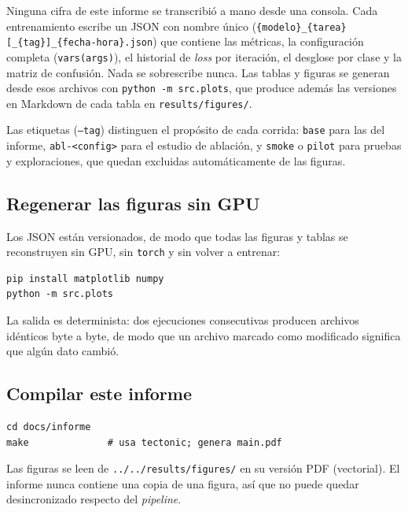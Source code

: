 Ninguna cifra de este informe se transcribió a mano desde una consola. Cada
entrenamiento escribe un JSON con nombre único
(\texttt{\{modelo\}\_\{tarea\}[\_\{tag\}]\_\{fecha-hora\}.json}) que contiene
las métricas, la configuración completa (\texttt{vars(args)}), el historial de
\textit{loss} por iteración, el desglose por clase y la matriz de confusión.
Nada se sobrescribe nunca. Las tablas y figuras se generan desde esos archivos
con \texttt{python -m src.plots}, que produce además las versiones en Markdown
de cada tabla en \texttt{results/figures/}.

Las etiquetas (\texttt{--tag}) distinguen el propósito de cada corrida:
\texttt{base} para las del informe, \texttt{abl-<config>} para el estudio de
ablación, y \texttt{smoke} o \texttt{pilot} para pruebas y exploraciones, que
quedan excluidas automáticamente de las figuras.

\subsection{Regenerar las figuras sin GPU}

Los JSON están versionados, de modo que todas las figuras y tablas se
reconstruyen sin GPU, sin \texttt{torch} y sin volver a entrenar:

\begin{lstlisting}
pip install matplotlib numpy
python -m src.plots
\end{lstlisting}

La salida es determinista: dos ejecuciones consecutivas producen archivos
idénticos byte a byte, de modo que un archivo marcado como modificado
significa que algún dato cambió.

\subsection{Compilar este informe}

\begin{lstlisting}
cd docs/informe
make              # usa tectonic; genera main.pdf
\end{lstlisting}

Las figuras se leen de \texttt{../../results/figures/} en su versión PDF
(vectorial). El informe nunca contiene una copia de una figura, así que no
puede quedar desincronizado respecto del \textit{pipeline}.
